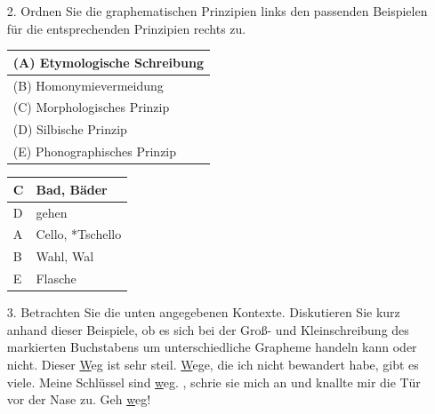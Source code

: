 {\begin{frame}
	\begin{itemize}
		\item[2.] Ordnen Sie die graphematischen Prinzipien links den passenden Beispielen für die entsprechenden Prinzipien rechts zu.
		\begin{table}[h!]
			\begin{minipage}{0.45\textwidth}
				\centering
				\begin{tabular}{|l|}
					\hline
					(A) Etymologische Schreibung\\
					\hline
					(B) Homonymievermeidung\\
					\hline
					(C) Morphologisches Prinzip\\
					\hline
					(D) Silbische Prinzip\\
					\hline
					(E) Phonographisches Prinzip\\
					\hline
				\end{tabular}
			\end{minipage}\hfill%
			\begin{minipage}{0.45\textwidth}
				\centering
				\begin{tabular}{|p{}|l|}
					\hline
					C & Bad, Bäder \\
					\hline
					D & gehen \\
					\hline
					A & Cello, *Tschello \\
					\hline
					B & Wahl, Wal\\
					\hline
					E & Flasche \\
					\hline
				\end{tabular}
			\end{minipage}
		\end{table}
	\end{itemize}
\end{frame}


\begin{frame}[allowframebreaks]
	\begin{itemize}
		\item[3.] Betrachten Sie die unten angegebenen Kontexte. Diskutieren Sie kurz anhand dieser Beispiele, ob es sich bei der Groß- und Kleinschreibung des markierten Buchstabens um unterschiedliche Grapheme handeln kann oder nicht.
		\eal
		\ex Dieser \underline{W}eg ist sehr steil.
		\ex \underline{W}ege, die ich nicht bewandert habe, gibt es viele.
		\ex Meine Schlüssel sind \underline{w}eg.
		\ex {}, schrie sie mich an und knallte mir die Tür vor der Nase zu.
		\ex Geh \underline{w}eg!
		\zl
		


\end{itemize}
\end{frame}}
